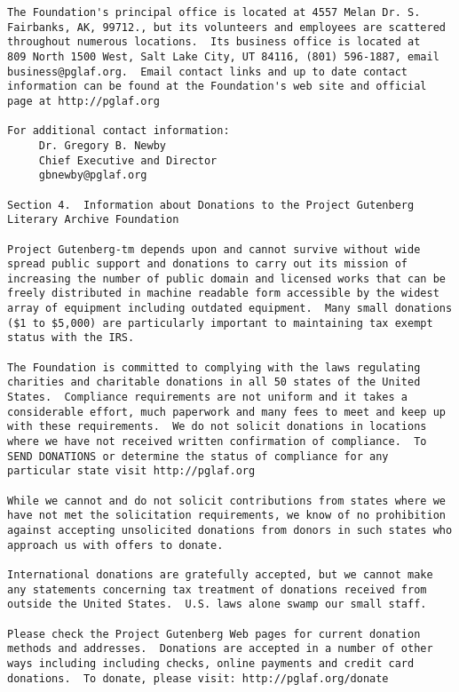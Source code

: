 \begin{Verbatim}[fontsize=\footnotesize]
The Foundation's principal office is located at 4557 Melan Dr. S.
Fairbanks, AK, 99712., but its volunteers and employees are scattered
throughout numerous locations.  Its business office is located at
809 North 1500 West, Salt Lake City, UT 84116, (801) 596-1887, email
business@pglaf.org.  Email contact links and up to date contact
information can be found at the Foundation's web site and official
page at http://pglaf.org

For additional contact information:
     Dr. Gregory B. Newby
     Chief Executive and Director
     gbnewby@pglaf.org

Section 4.  Information about Donations to the Project Gutenberg
Literary Archive Foundation

Project Gutenberg-tm depends upon and cannot survive without wide
spread public support and donations to carry out its mission of
increasing the number of public domain and licensed works that can be
freely distributed in machine readable form accessible by the widest
array of equipment including outdated equipment.  Many small donations
($1 to $5,000) are particularly important to maintaining tax exempt
status with the IRS.

The Foundation is committed to complying with the laws regulating
charities and charitable donations in all 50 states of the United
States.  Compliance requirements are not uniform and it takes a
considerable effort, much paperwork and many fees to meet and keep up
with these requirements.  We do not solicit donations in locations
where we have not received written confirmation of compliance.  To
SEND DONATIONS or determine the status of compliance for any
particular state visit http://pglaf.org

While we cannot and do not solicit contributions from states where we
have not met the solicitation requirements, we know of no prohibition
against accepting unsolicited donations from donors in such states who
approach us with offers to donate.

International donations are gratefully accepted, but we cannot make
any statements concerning tax treatment of donations received from
outside the United States.  U.S. laws alone swamp our small staff.

Please check the Project Gutenberg Web pages for current donation
methods and addresses.  Donations are accepted in a number of other
ways including including checks, online payments and credit card
donations.  To donate, please visit: http://pglaf.org/donate



\end{Verbatim}
